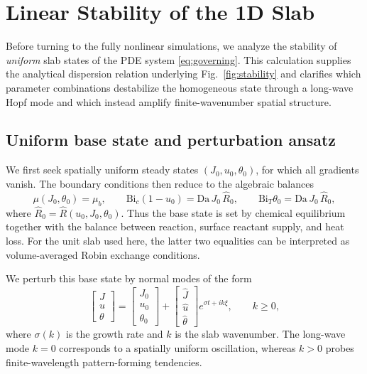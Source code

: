 \documentclass[aps,pre,reprint,superscriptaddress,longbibliography,floatfix]{revtex4-2}
\newcommand{\Da}{\mathrm{Da}}
\newcommand{\Bi}{\mathrm{Bi}}
\newcommand{\Rhat}{\widehat{R}}
\begin{document}
\section{Linear Stability of the 1D Slab}
\label{sec:0d}

Before turning to the fully nonlinear simulations, we analyze the
stability of \emph{uniform} slab states of the PDE system
\eqref{eq:governing}. This calculation supplies the analytical
dispersion relation underlying Fig.~\ref{fig:stability} and clarifies
which parameter combinations destabilize the homogeneous state through a
long-wave Hopf mode and which instead amplify finite-wavenumber spatial
structure.

\subsection{Uniform base state and perturbation ansatz}

We first seek spatially uniform steady states
$(J_0,u_0,\theta_0)$, for which all gradients vanish. The boundary
conditions then reduce to the algebraic balances
\begin{equation}
  \mu(J_0,\theta_0)=\mu_b,\qquad
  \Bi_c(1-u_0)=\Da\,J_0\,\Rhat_0,\qquad
  \Bi_T\theta_0=\Da\,J_0\,\Rhat_0,
  \label{eq:lsa_ss}
\end{equation}
where $\Rhat_0=\Rhat(u_0,J_0,\theta_0)$. Thus the base state is set by
chemical equilibrium together with the balance between reaction, surface
reactant supply, and heat loss. For the unit slab used here, the latter
two equalities can be interpreted as volume-averaged Robin exchange
conditions.

We perturb this base state by normal modes of the form
\begin{equation}
  \begin{bmatrix}
    J \\ u \\ \theta
  \end{bmatrix}
  =
  \begin{bmatrix}
    J_0 \\ u_0 \\ \theta_0
  \end{bmatrix}
  +
  \begin{bmatrix}
    \widehat{J} \\ \widehat{u} \\ \widehat{\theta}
  \end{bmatrix}
  e^{\sigma t + ik\xi},
  \qquad k\ge 0,
  \label{eq:lsa_ansatz}
\end{equation}
where $\sigma(k)$ is the growth rate and $k$ is the slab wavenumber.
The long-wave mode $k=0$ corresponds to a spatially uniform oscillation,
whereas $k>0$ probes finite-wavelength pattern-forming tendencies.
\end{document}
